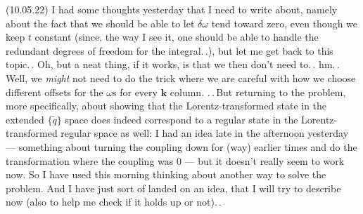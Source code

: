 \documentclass{report}
\begin{document}
(10.05.22) I had some thoughts yesterday that I need to write about, namely about the fact that we should be able to let $\delta\omega$ tend toward zero, even though we keep $t$ constant (since, the way I see it, one should be able to handle the redundant degrees of freedom for the integral.\,.), but let me get back to this topic.\,. Oh, but a neat thing, if it works, is that we then don't need to.\,. hm.\,. Well, we \emph{might} not need to do the trick where we are careful with how we choose different offsets for the $\omega$s for every $\boldsymbol{k}$ column. .\,.\,But returning to the problem, more specifically, about showing that the Lorentz-transformed state in the extended $\{\tilde q\}$ space does indeed correspond to a regular state in the Lorentz-transformed regular space as well: I had an idea late in the afternoon yesterday --- something about turning the coupling down for (way) earlier times and do the transformation where the coupling was 0 --- but it doesn't really seem to work now. So I have used this morning %
thinking about another way to solve the problem. And I have just sort of landed on an idea, that I will try to describe now (also to help me check if it holds up or not).\,. 
\end{document}
